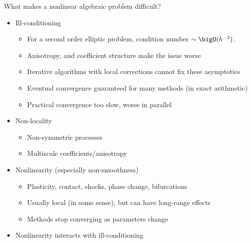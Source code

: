 \begin{frame}{What makes a nonlinear algebraic problem difficult?}
  \begin{itemize}
  \item Ill-conditioning
    \begin{itemize}
    \item For a second order elliptic problem, condition number $\sim \bigO(h^{-2})$.
    \item Anisotropy, and coefficient structure make the issue worse
    \item Iterative algorithms with local corrections cannot fix these asymptotics
    \item Eventual convergence guaranteed for many methods (in exact arithmetic)
    \item Practical convergence too slow, worse in parallel
    \end{itemize}
  \item Non-locality
    \begin{itemize}
    \item Non-symmetric processes
    \item Multiscale coefficients/anisotropy
    \end{itemize}
  \item Nonlinearity (especially non-smoothness)
    \begin{itemize}
    \item Plasticity, contact, shocks, phase change, bifurcations
    \item Usually local (in some sense), but can have long-range effects
    \item Methods stop converging as parameters change
    \end{itemize}
  \item<2> Nonlinearity interacts with ill-conditioning
  \end{itemize}
\end{frame}
